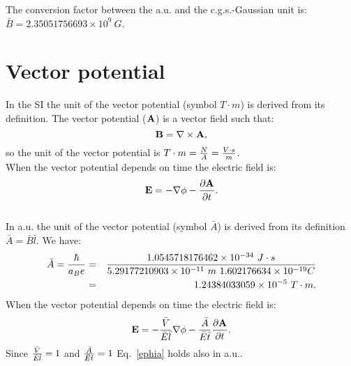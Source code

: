 \documentclass[12pt,a4paper]{article}
\def\hbarf{1.0545718176462\times 10^{-34}}
\def\e{1.602176634\times 10^{-19}}
\def\abohr{5.29177210903\times 10^{-11}}
\def\barav{1.24384033059\times 10^{-5}}
\def\toverg{9.99999999726\times 10^{3}}
\def\barbcgs{2.35051756693\times 10^{9}}
\begin{document}

{\color{green} 
The conversion factor between the a.u. and the c.g.s.-Gaussian unit is: 
$\bar B = \barbcgs\ G$.
}

\newpage
\section{\color{coral}Vector potential}

In the SI the unit of the vector potential (symbol $T \cdot m$)
is derived from its definition. The vector potential (${\bf A}$)
is a vector field such that:
\begin{equation}
{\bf B}=\nabla \times {\bf A},
\label{defav}
\end{equation}
so the unit of the vector potential is $T\cdot m={N \over A}=
{V\cdot s \over m}$. \\
When the vector potential depends on time the electric field is:
\begin{equation}
{\bf E}=-\nabla \phi -{\partial {\bf A} \over \partial t}.
\label{ephia}
\end{equation}
\\

{\color{web-blue} In a.u. the unit of the vector potential
(symbol $\bar A$) is derived from its definition $\bar A = \bar B \bar l$.
We have:
\begin{eqnarray}
\bar A = {\hbar \over a_B e}&=&{\hbarf\ J\cdot s \over \abohr\ m\ \e C}
\nonumber \\ 
&=& \barav\ T\cdot m.
\end{eqnarray}
When the vector potential depends on time the electric field is:
\begin{equation}
{\bf E}=-{\bar V \over \bar E \bar l} \nabla \phi -
{\bar A \over \bar E \bar t} {\partial {\bf A} \over \partial t}.
\label{ephiagen}
\end{equation}
Since ${\bar V \over \bar E \bar l}=1$ and 
${\bar A \over \bar E \bar t}=1$ Eq.~\ref{ephia} holds also in a.u..
}
\\
\end{document}
